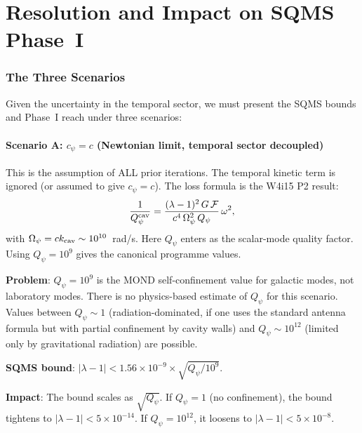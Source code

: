 \documentclass[11pt]{article}
\newcommand{\lbone}{|\lambda - 1|}
\newcommand{\Qpsi}{Q_\psi}
\newcommand{\ee}[1]{\times 10^{#1}}
\newcommand{\Opsi}{\Omega_\psi}
\newcommand{\calF}{\mathcal{F}}
\theoremstyle{definition}
\theoremstyle{remark}
\begin{document}
\part{Resolution and Impact on SQMS Phase~I}
\label{part:impact}


\section{The Three Scenarios}
\label{sec:scenarios}

Given the uncertainty in the temporal sector, we must present the
SQMS bounds and Phase~I reach under three scenarios:

\subsection{Scenario A: $c_\psi = c$ (Newtonian limit, temporal sector decoupled)}

This is the assumption of ALL prior iterations. The temporal kinetic
term is ignored (or assumed to give $c_\psi = c$). The loss formula
is the W4i15 P2 result:
\begin{equation}
\frac{1}{Q_\psi^{\rm cav}} = \frac{(\lambda-1)^2\,G\,\calF}
{c^4\,\Opsi^2\,\Qpsi}\,\omega^2,
\end{equation}
with $\Opsi = c k_{\rm cav} \sim 10^{10}$~rad/s. Here $\Qpsi$ enters
as the scalar-mode quality factor. Using $\Qpsi = 10^9$ gives the
canonical programme values.

\textbf{Problem}: $\Qpsi = 10^9$ is the MOND self-confinement value
for galactic modes, not laboratory modes. There is no physics-based
estimate of $\Qpsi$ for this scenario. Values between $\Qpsi \sim 1$
(radiation-dominated, if one uses the standard antenna formula but
with partial confinement by cavity walls) and $\Qpsi \sim 10^{12}$
(limited only by gravitational radiation) are possible.

\textbf{SQMS bound}: $\lbone < 1.56\ee{-9}\times\sqrt{\Qpsi/10^9}$.

\textbf{Impact}: The bound scales as $\sqrt{\Qpsi}$. If $\Qpsi = 1$
(no confinement), the bound tightens to $\lbone < 5\ee{-14}$.
If $\Qpsi = 10^{12}$, it loosens to $\lbone < 5\ee{-8}$.
\end{document}
